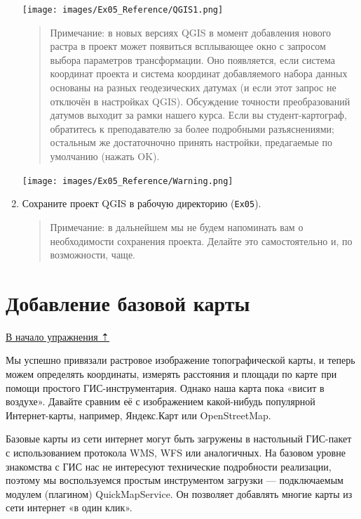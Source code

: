 \documentclass[
  12pt,
]{book}
\begin{document}
\begin{enumerate}
  \texttt{[image: images/Ex05\_Reference/QGIS1.png]}

  \begin{quote}
  Примечание: в новых версиях QGIS в момент добавления нового растра в проект может появиться всплывающее окно с запросом выбора параметров трансформации. Оно появляется, если система координат проекта и система координат добавляемого набора данных основаны на разных геодезических датумах (и если этот запрос не отключён в настройках QGIS). Обсуждение точности преобразований датумов выходит за рамки нашего курса. Если вы студент-картограф, обратитесь к преподавателю за более подробными разъяснениями; остальным же достаточночно принять настройки, предагаемые по умолчанию (нажать OK).
  \end{quote}

  \texttt{[image: images/Ex05\_Reference/Warning.png]}
\item
  Сохраните проект QGIS в рабочую директорию (\texttt{Ex05}).

  \begin{quote}
  Примечание: в дальнейшем мы не будем напоминать вам о необходимости сохранения проекта. Делайте это самостоятельно и, по возможности, чаще.
  \end{quote}
\end{enumerate}

\hypertarget{raster-reference-basemap}{%
\section{Добавление базовой карты}\label{raster-reference-basemap}}

\protect\hyperlink{raster-reference}{В начало упражнения ⇡}

Мы успешно привязали растровое изображение топографической карты, и теперь можем определять координаты, измерять расстояния и площади по карте при помощи простого ГИС-инструментария. Однако наша карта пока «висит в воздухе». Давайте сравним её с изображением какой-нибудь популярной Интернет-карты, например, Яндекс.Карт или OpenStreetMap.

Базовые карты из сети интернет могут быть загружены в настольный ГИС-пакет с использованием протокола WMS, WFS или аналогичных. На базовом уровне знакомства с ГИС нас не интересуют технические подробности реализации, поэтому мы воспользуемся простым инструментом загрузки --- подключаемым модулем (плагином) QuickMapService. Он позволяет добавлять многие карты из сети интернет «в один клик».
\end{document}
